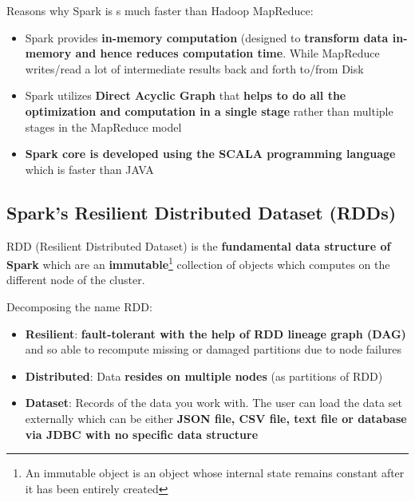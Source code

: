 \documentclass{beamer}[10pt, usepdftitle=false handout]
\begin{document}
\begin{frame}
Reasons why Spark is s much faster than Hadoop MapReduce:
\vspace*{0.6em}

\begin{itemize}
\item{Spark provides \textbf{in-memory computation} (designed to \textbf{transform data in-memory and hence reduces computation time}. While MapReduce writes/read a lot of intermediate results back and forth to/from Disk}
\item{Spark utilizes \textbf{Direct Acyclic Graph} that \textbf{helps to do all the optimization and computation in a single stage} rather than multiple stages in the MapReduce model}
\item{\textbf{Spark core is developed using the SCALA programming language} which is faster than JAVA}
\end{itemize}

\end{frame}

\subsection{Spark's Resilient Distributed Dataset (RDDs)}



\begin{frame}

RDD (Resilient Distributed Dataset) is the \textbf{fundamental data structure of Spark} which are an \textbf{immutable}\footnote{An immutable object is an object whose internal state remains constant after it has been entirely created} collection of objects which computes on the different node of the cluster. 
\vspace*{0.6em}

Decomposing the name RDD:
\vspace*{0.6em}

\begin{itemize}
\item{\textbf{Resilient}: \textbf{fault-tolerant with the help of RDD lineage graph (DAG)} and so able to recompute missing or damaged partitions due to node failures}
\item{\textbf{Distributed}: Data \textbf{resides on multiple nodes} (as partitions of RDD)}
\item{\textbf{Dataset}: Records of the data you work with. The user can load the data set externally which can be either \textbf{JSON file, CSV file, text file or database via JDBC with no specific data structure}}
\end{itemize}

\end{frame}
\end{document}
